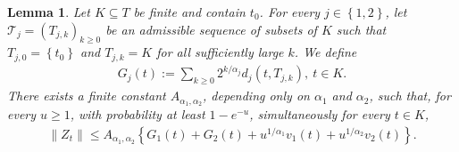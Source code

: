 \documentclass[10pt,a4paper]{amsart}
\newtheorem{lemma}{Lemma}
\newcommand{\cbr}[1]{\left\{#1\right\}}
\begin{document}
\begin{lemma}
\label{lem:mixed_tail_finite_pointwise}
Let $K\subseteq T$ be finite and contain $t_0$. For every
$j\in\cbr{1,2}$, let $\mathcal T_j=(T_{j,k})_{k\ge0}$ be an admissible sequence of subsets of $K$ such that $T_{j,0}=\cbr{t_0}$ and $T_{j,k}=K$ for all sufficiently large $k$. We define
\begin{align*}
G_j(t)
:=
\sum_{k\ge0}
2^{k/\alpha_j}d_j(t,T_{j,k}),
\ t\in K.
\end{align*}
There exists a finite constant $A_{\alpha_1,\alpha_2}$, depending only
on $\alpha_1$ and $\alpha_2$, such that, for every $u\ge1$, with
probability at least $1-e^{-u}$, simultaneously for every $t\in K$,
\begin{align*}
\|Z_t\|
\le
A_{\alpha_1,\alpha_2}
\cbr{
G_1(t)+G_2(t)
+
u^{1/\alpha_1}v_1(t)
+
u^{1/\alpha_2}v_2(t)
}.
\end{align*}
\end{lemma}
\end{document}
